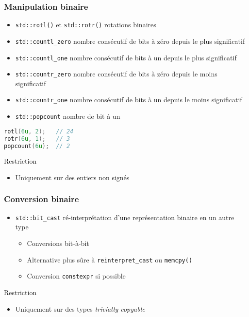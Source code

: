 \documentclass[C++.tex]{subfiles}
\begin{document}
\begin{frame}[fragile]
	\frametitle{Manipulation binaire}
	\begin{itemize}
		\item \lstinline|std::rotl()| et \lstinline|std::rotr()| rotations binaires


		\item \lstinline|std::countl_zero| nombre consécutif de bits à zéro depuis le plus significatif
		\item \lstinline|std::countl_one| nombre consécutif de bits à un depuis le plus significatif
		\item \lstinline|std::countr_zero| nombre consécutif de bits à zéro depuis le moins significatif
		\item \lstinline|std::countr_one| nombre consécutif de bits à un depuis le moins significatif
		\item \lstinline|std::popcount| nombre de bit à un
	\end{itemize}

	\begin{lstlisting}[language=C++]
rotl(6u, 2);   // 24
rotr(6u, 1);   // 3
popcount(6u);  // 2\end{lstlisting}

	\begin{alertblock}{Restriction}
		\begin{itemize}
			\item Uniquement sur des entiers non signés
		\end{itemize}
	\end{alertblock}
\end{frame}

\begin{frame}[fragile]
	\frametitle{Conversion binaire}
	\begin{itemize}
		\item \lstinline|std::bit_cast| ré-interprétation d'une représentation binaire en un autre type
		\begin{itemize}
			\item Conversions bit-à-bit
			\item Alternative plus sûre à \lstinline|reinterpret_cast| ou \lstinline|memcpy()|
			\item Conversion \lstinline|constexpr| si possible
		\end{itemize}
	\end{itemize}

	\begin{alertblock}{Restriction}
		\begin{itemize}
			\item Uniquement sur des types \textit{trivially copyable}
		\end{itemize}
	\end{alertblock}
\end{frame}
\end{document}
